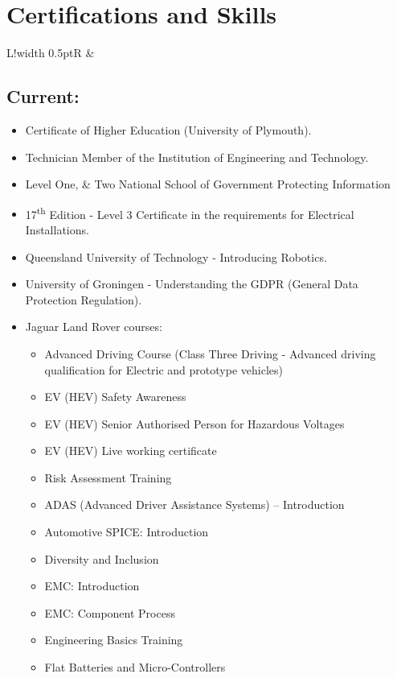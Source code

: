 \documentclass[a4paper]{article}
\newcommand\VRule{\color{lightgray}\vrule width 0.5pt}
\begin{document}
\section{Certifications and Skills}
\begin{tabularx}{\textwidth}{L!{\VRule}R}
    & \subsection{Current:}
    \begin{itemize}
        \item Certificate of Higher Education (University of Plymouth).
        \item Technician Member of the Institution of Engineering and Technology.
        \item Level One, \& Two National School of Government Protecting Information
        \item 17\textsuperscript{th} Edition - Level 3 Certificate in the requirements for Electrical Installations.
        \item Queensland University of Technology - Introducing Robotics.
        \item University of Groningen - Understanding the GDPR (General Data Protection Regulation).
        \item Jaguar Land Rover courses:
        \begin{itemize}
        \item Advanced Driving Course (Class Three Driving - Advanced driving qualification for Electric and prototype vehicles) 
        \item EV (HEV) Safety Awareness
        \item EV (HEV) Senior Authorised Person for Hazardous Voltages 
        \item EV (HEV) Live working certificate
        \item Risk Assessment Training %
        \item ADAS (Advanced Driver Assistance Systems) – Introduction
        \item Automotive SPICE: Introduction
        \item Diversity and Inclusion
        \item EMC: Introduction
        \item EMC: Component Process
        \item Engineering Basics Training
        \item Flat Batteries and Micro-Controllers

\end{itemize}
\end{itemize}
\end{tabularx}
\end{document}
